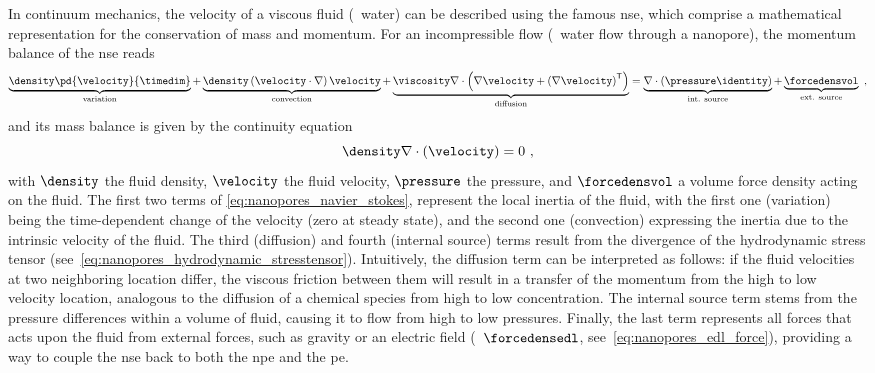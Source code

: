 In continuum mechanics, the velocity of a viscous fluid (\eg~water) can be described using the famous
\gls{nse}, which comprise a mathematical representation for the conservation of mass and momentum. For an
incompressible flow (\ie~water flow through a nanopore), the momentum balance of the \gls{nse} reads
%
\begin{equation}\label{eq:nanopores_navier_stokes}
  \underbrace{ \density \pd{\velocity}{\timedim} }_{\text{variation}}
  +
  \underbrace{ \density \left( \velocity \cdot \nabla \right) \velocity }_{\text{convection}}
  +
  \underbrace{ \viscosity \nabla \cdot \left(
    \nabla \velocity + \left(\nabla\velocity \right)^\mathsf{T} \right) }_{\text{diffusion}}
  =
  \underbrace{\nabla \cdot \left(\pressure \identity \right)}_{\text{int. source}}
  +
  \underbrace{ \forcedensvol }_{\text{ext. source}}
  \text{ ,}
\end{equation}
%
and its mass balance is given by the continuity equation
%
\begin{equation}\label{eq:nanopores_velocity_continuity}
  \density \nabla \cdot \left( \velocity \right) = 0
  \text{ ,}
\end{equation}
%
with $\density$ the fluid density, $\velocity$ the fluid velocity, $\pressure$ the pressure, and
$\forcedensvol$ a volume force density acting on the fluid. The first two terms of
\cref{eq:nanopores_navier_stokes}, represent the local inertia of the fluid, with the first one (variation)
being the time-dependent change of the velocity (zero at steady state), and the second one (convection)
expressing the inertia due to the intrinsic velocity of the fluid. The third (diffusion) and fourth (internal
source) terms result from the divergence of the hydrodynamic stress tensor
(see~\cref{eq:nanopores_hydrodynamic_stresstensor}). Intuitively, the diffusion term can be interpreted as
follows: if the fluid velocities at two neighboring location differ, the viscous friction between them will
result in a transfer of the momentum from the high to low velocity location, analogous to the diffusion of a
chemical species from high to low concentration. The internal source term stems from the pressure differences
within a volume of fluid, causing it to flow from high to low pressures. Finally, the last term represents all
forces that acts upon the fluid from external forces, such as gravity or an electric field
(\ie~$\forcedensedl$, see~\cref{eq:nanopores_edl_force}), providing a way to couple the \gls{nse} back to both
the \gls{npe} and the \gls{pe}.

